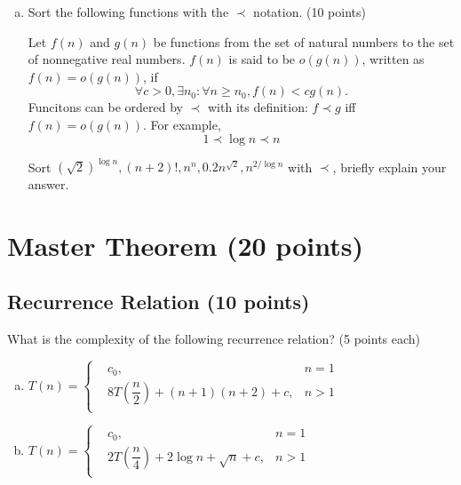 \documentclass[11pt]{exam}
\begin{document}
\begin{enumerate}[(a)]
\item Sort the following functions with the $\prec$ notation. (10 points)
\begin{definition}
Let $f(n)$ and $g(n)$ be functions from the set of natural numbers to the set of nonnegative real numbers.
$f(n)$ is said to be $o(g(n))$, written as $f(n)=o(g(n))$, if
$$\forall c>0,\exists n_{0}:\forall n\ge n_{0},f(n)<c g(n).$$
Funcitons can be ordered by $\prec$ with its definition: $f\prec g$ iff $f(n)=o(g(n))$. For example,
$$1 \prec \log n \prec n$$
\end{definition}
Sort $(\sqrt{2})^{\log n}, (n+2)!, n^n, 0.2n^{\sqrt{2}},  n^{2/\log n}$ with $\prec$, briefly explain your answer.
\begin{solution}
\end{solution}
\end{enumerate}

\newpage
\section{Master Theorem (20 points)}
\subsection{Recurrence Relation (10 points)}
What is the complexity of the following recurrence relation? (5 points each)
\begin{enumerate}[(a)]

\item $T(n) = \left\{
\begin{aligned}
&c_0, &n=1\\
&8T\left(\dfrac{n}{2}\right)+(n + 1)(n + 2) + c, &n>1\\
\end{aligned}
\right.
$

\begin{solution}

\end{solution}

\item $T(n) = \left\{
\begin{aligned}
&c_0, &n=1\\
&2T\left(\dfrac{n}{4}\right)+2\log n+\sqrt{n}+c, &n>1\\
\end{aligned}
\right.
$

\begin{solution}

\end{solution}
\end{enumerate}
\end{document}

